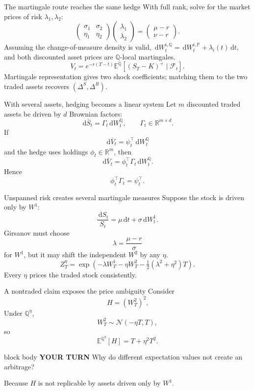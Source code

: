 \documentclass[handout,10pt,aspectratio=169]{beamer}
\newenvironment{pausebox}{\begin{beamercolorbox}[rounded=true,sep=0.8em,wd=\textwidth]{block body}
  \textbf{\color{CourseGold}YOUR TURN}\quad}{\end{beamercolorbox}}
\newcommand{\dd}{\,\mathrm d}
\newcommand{\E}{\mathbb E}
\newcommand{\Pp}{\mathbb P}
\newcommand{\Q}{\mathbb Q}
\newcommand{\R}{\mathbb R}
\newcommand{\cF}{\mathcal F}
\newcommand{\1}{\mathbf 1}
\newcommand{\Nlaw}{\mathcal N}
\begin{document}
\begin{frame}{The martingale route reaches the same hedge}
With full rank, solve for the market prices of risk \(\lambda_1,\lambda_2\):
\[
\begin{pmatrix}\sigma_1&\sigma_2\\\eta_1&\eta_2\end{pmatrix}
\begin{pmatrix}\lambda_1\\\lambda_2\end{pmatrix}
=\begin{pmatrix}\mu-r\\\nu-r\end{pmatrix}.
\]
Assuming the change-of-measure density is valid,
\(\dd W_t^{i,\Q}=\dd W_t^{i,\Pp}+\lambda_i(t)\dd t\), and both discounted
asset prices are \(\Q\)-local martingales.
\[
\boxed{V_t=e^{-r(T-t)}\E^\Q[(S_T-K)^+\mid\cF_t].}
\]
Martingale representation gives two shock coefficients; matching them to
the two traded assets recovers \((\Delta^S,\Delta^R)\).
\end{frame}

\begin{frame}{With several assets, hedging becomes a linear system}
Let \(m\) discounted traded assets be driven by \(d\) Brownian factors:
\[
\dd\bar S_t=\Gamma_t\dd W_t^\Q,
\qquad
\Gamma_t\in\R^{m\times d}.
\]
If
\[
\dd\bar V_t=\psi_t^\top\dd W_t^\Q
\]
and the hedge uses holdings \(\phi_t\in\R^m\), then
\[
\dd\bar V_t=\phi_t^\top\Gamma_t\dd W_t^\Q.
\]
Hence
\[
\boxed{\phi_t^\top\Gamma_t=\psi_t^\top.}
\]
\end{frame}


\begin{frame}{Unspanned risk creates several martingale measures}
Suppose the stock is driven only by \(W^1\):
\[
\frac{\dd S_t}{S_t}=\mu\dd t+\sigma\dd W_t^1.
\]
Girsanov must choose
\[
\lambda=\frac{\mu-r}{\sigma}
\]
for \(W^1\), but it may shift the independent \(W^2\) by any \(\eta\).
\[
Z_T^\eta
=\exp\!\left(
-\lambda W_T^1-\eta W_T^2
-\tfrac12(\lambda^2+\eta^2)T\right).
\]
Every \(\eta\) prices the traded stock consistently.
\end{frame}

\begin{frame}{A nontraded claim exposes the price ambiguity}
Consider
\[
H=(W_T^2)^2.
\]
Under \(\Q^\eta\),
\[
W_T^2\sim\Nlaw(-\eta T,T),
\]
so
\[
\boxed{
\E^{\Q^\eta}[H]=T+\eta^2T^2.}
\]
\begin{pausebox}
Why do different expectation values not create an arbitrage?
\end{pausebox}

Because \(H\) is not replicable by assets driven only by \(W^1\).
\end{frame}
\end{document}
